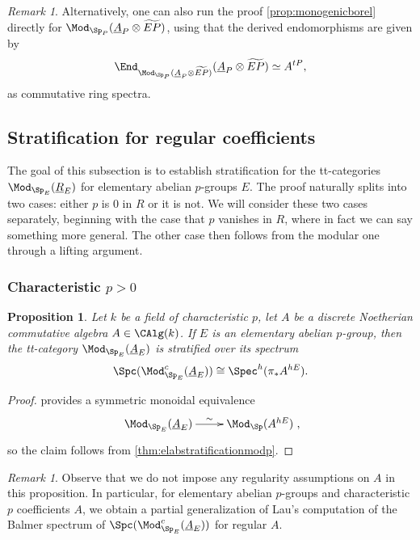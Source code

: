 \documentclass{amsart}%
\numberwithin{equation}{section}%
\newtheorem{Prop}[subsection]{Proposition}
\theoremstyle{remark}
\newtheorem{Rem}[subsection]{Remark}
\begin{document}
\begin{Rem}
Alternatively, one can also run the proof \cref{prop:monogenicborel} directly for $\Mod_{\Sp_P}(\underline{A}_P \otimes \widetilde{EP})$, using that the derived endomorphisms are given by
\[
\End_{\Mod_{\Sp_P}(\underline{A}_P \otimes \widetilde{EP})}(\underline{A}_P \otimes \widetilde{EP}) \simeq A^{tP},
\]
as commutative ring spectra.
\end{Rem}


\subsection{Stratification for regular coefficients}

The goal of this subsection is to establish stratification for the tt-categories $\Mod_{\Sp_{E}}(\underline{R}_E)$ for elementary abelian $p$-groups $E$. The proof naturally splits into two cases: either $p$ is $0$ in $R$ or it is not. We will consider these two cases separately, beginning with the case that $p$ vanishes in $R$, where in fact we can say something more general. The other case then follows from the modular one through a lifting argument. 

\subsubsection*{Characteristic $p>0$}

\begin{Prop}\label{prop:elabeqstratificationcharp}
Let $k$ be a field of characteristic $p$, let $A$ be a discrete Noetherian commutative algebra $A \in \CAlg(k)$. If $E$ is an elementary abelian $p$-group, then the tt-category $\Mod_{\Sp_{E}}(\underline{A}_E)$ is stratified over its spectrum
\[
\Spc(\Mod_{\Sp_{E}}^c(\underline{A}_E)) \cong \Spec^h(\pi_*A^{hE}).
\]
\end{Prop}
\begin{proof}
 provides a symmetric monoidal equivalence 
\[
\xymatrix{\Mod_{\Sp_E}(\underline{A}_E) \ar[r]^-{\sim} & \Mod_{\Sp}(A^{hE})},
\]
so the claim follows from \cref{thm:elabstratificationmodp}.
\end{proof}

\begin{Rem}
Observe that we do not impose any regularity assumptions on $A$ in this proposition. In particular, for elementary abelian $p$-groups and characteristic $p$ coefficients $A$, we obtain a partial generalization of Lau's computation \cite{lau_spcdmstacks} of the Balmer spectrum of $\Spc(\Mod_{\Sp_{E}}^c(\underline{A}_E))$ for regular $A$.
\end{Rem}
\end{document}
